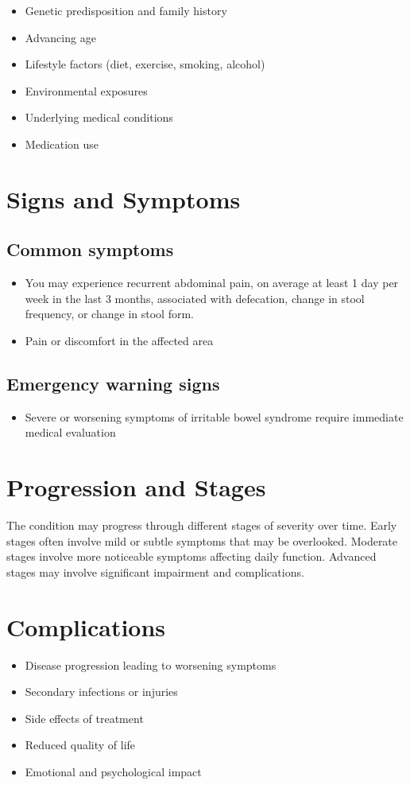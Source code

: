 \begin{itemize}[noitemsep]
  \item Genetic predisposition and family history
  \item Advancing age
  \item Lifestyle factors (diet, exercise, smoking, alcohol)
  \item Environmental exposures
  \item Underlying medical conditions
  \item Medication use
\end{itemize}
\section{Signs and Symptoms}

\subsection{Common symptoms}
\begin{itemize}[noitemsep]
  \item You may experience recurrent abdominal pain, on average at least 1 day per week in the last 3 months, associated with defecation, change in stool frequency, or change in stool form.
  \item Pain or discomfort in the affected area
  \end{itemize}

\subsection{Emergency warning signs}
\begin{itemize}[noitemsep]
  \item Severe or worsening symptoms of irritable bowel syndrome require immediate medical evaluation
\end{itemize}
\section{Progression and Stages}
The condition may progress through different stages of severity over time. Early stages often involve mild or subtle symptoms that may be overlooked. Moderate stages involve more noticeable symptoms affecting daily function. Advanced stages may involve significant impairment and complications.
\section{Complications}
\begin{itemize}[noitemsep]
  \item Disease progression leading to worsening symptoms
  \item Secondary infections or injuries
  \item Side effects of treatment
  \item Reduced quality of life
  \item Emotional and psychological impact
\end{itemize}
